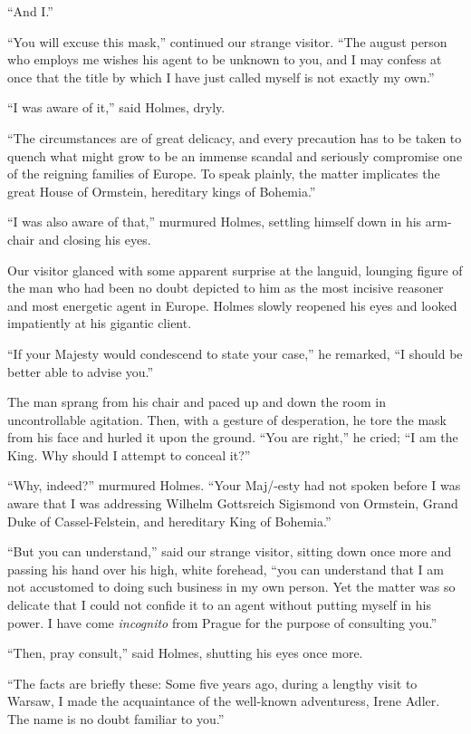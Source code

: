“And I.”

“You will excuse this mask,” continued our strange visitor.
“The august person who employs me wishes his agent to be
unknown to you, and I may confess at once that the title by
which I have just called myself is not exactly my own.”

“I was aware of it,” said Holmes, dryly.

“The circumstances are of great delicacy, and every precaution
has to be taken to quench what might grow to be
an immense scandal and seriously compromise one of the
reigning families of Europe. To speak plainly, the matter
implicates the great House of Ormstein, hereditary kings of
Bohemia.”

“I was also aware of that,” murmured Holmes, settling
himself down in his arm-chair and closing his eyes.

Our visitor glanced with some apparent surprise at the
languid, lounging figure of the man who had been no doubt
depicted to him as the most incisive reasoner and most energetic
agent in Europe. Holmes slowly reopened his eyes and
looked impatiently at his gigantic client.

“If your Majesty would condescend to state your case,” he
remarked, “I should be better able to advise you.”

The man sprang from his chair and paced up and down
the room in uncontrollable agitation. Then, with a gesture of
desperation, he tore the mask from his face and hurled it
upon the ground. “You are right,” he cried; “I am the
King. Why should I attempt to conceal it?”

“Why, indeed?” murmured Holmes. “Your Maj/-esty had
not spoken before I was aware that I was addressing Wilhelm
Gottsreich Sigismond von Ormstein, Grand Duke of Cassel-Felstein,
and hereditary King of Bohemia.”

“But you can understand,” said our strange visitor, sitting
down once more and passing his hand over his high, white
forehead, “you can understand that I am not accustomed to
doing such business in my own person. Yet the matter was
so delicate that I could not confide it to an agent without
putting myself in his power. I have come \textit{incognito} from
Prague for the purpose of consulting you.”

“Then, pray consult,” said Holmes, shutting his eyes once
more.

“The facts are briefly these: Some five years ago, during
a lengthy visit to Warsaw, I made the acquaintance of the
well-known adventuress, Irene Adler. The name is no doubt
familiar to you.”

